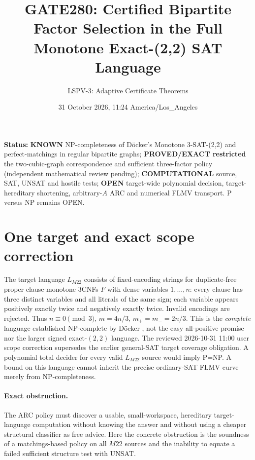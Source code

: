 \documentclass[11pt]{article}
\title{GATE280: Certified Bipartite Factor Selection in the Full Monotone Exact-(2,2) SAT Language}
\author{LSPV-3: Adaptive Certificate Theorems}
\date{31 October 2026, 11:24 America/Los\_Angeles}
\begin{document}
\maketitle
\noindent\textbf{Status:} \textbf{KNOWN} NP-completeness of D\"ocker's Monotone 3-SAT-(2,2) and perfect-matchings in regular bipartite graphs; \textbf{PROVED/EXACT restricted} the two-cubic-graph correspondence and sufficient three-factor policy (independent mathematical review pending); \textbf{COMPUTATIONAL} source, SAT, UNSAT and hostile tests; \textbf{OPEN} target-wide polynomial decision, target-hereditary shortening, arbitrary-$A$ ARC and numerical FLMV transport. P versus NP remains OPEN.

\section{One target and exact scope correction}
The target language $L_{M22}$ consists of fixed-encoding strings for duplicate-free proper clause-monotone 3CNFs $F$ with dense variables $1,\dots,n$: every clause has three distinct variables and all literals of the same sign; each variable appears positively exactly twice and negatively exactly twice. Invalid encodings are rejected. Thus $n\equiv0\pmod3$, $m=4n/3$, $m_+=m_-=2n/3$. This is the \emph{complete} language established NP-complete by D\"ocker \cite{docker}, not the easy all-positive promise nor the larger signed exact-$(2,2)$ language. The reviewed 2026-10-31 11:00 user scope correction supersedes the earlier general-SAT target coverage obligation. A polynomial total decider for every valid $L_{M22}$ source would imply P=NP. A bound on this language cannot inherit the precise ordinary-SAT FLMV curve merely from NP-completeness.

\paragraph{Exact obstruction.} The ARC policy must discover a usable, small-workspace, hereditary target-language computation without knowing the answer and without using a cheaper structural classifier as free advice. Here the concrete obstruction is the soundness of a matchings-based policy on all $M22$ sources and the inability to equate a failed sufficient structure test with UNSAT.
\end{document}
